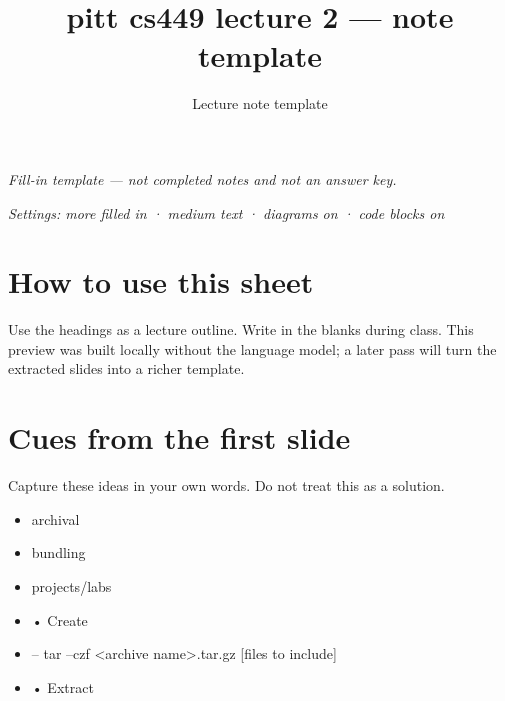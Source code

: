 \documentclass[12pt]{article}
\title{pitt cs449 lecture 2 — note template}
\author{Lecture note template}
\date{}
\begin{document}
\maketitle
\begin{center}
\textit{Fill-in template --- not completed notes and not an answer key.}
\end{center}
\noindent\textit{Settings: more filled in · medium text · diagrams on · code blocks on}
\vspace{1em}
\section*{How to use this sheet}
Use the headings as a lecture outline. Write in the blanks during class.
This preview was built locally without the language model; a later pass will
turn the extracted slides into a richer template.
\section*{Cues from the first slide}
Capture these ideas in your own words. Do not treat this as a solution.
\begin{itemize}[leftmargin=*]
  \item archival \hrulefill
  \vspace{1.1em}
  \item bundling \hrulefill
  \vspace{1.1em}
  \item projects/labs \hrulefill
  \vspace{1.1em}
  \item • Create \hrulefill
  \vspace{1.1em}
  \item – tar –czf <archive name>.tar.gz [files to include] \hrulefill
  \vspace{1.1em}
  \item • Extract \hrulefill
  \vspace{1.1em}
\end{itemize}
\end{document}
